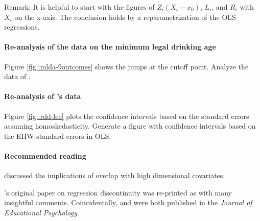 Remark: It is helpful to start with the figures of $Z_i(X_i - x_0)$, $L_i$, and $R_i$ with $X_i$ on the x-axis. The conclusion holds by a reparametrization of the OLS regressions. 



\paragraph{Re-analysis of the data on the minimum legal drinking age}\label{hw::MLDA}


Figure \ref{fig::mlda-9outcomes} shows the jumps at the cutoff point. 
Analyze the data  of \citet{carpenter2009effect}.

\paragraph{Re-analysis of \citet{lee2008randomized}'s data}\label{hw::lee2008-robust}

Figure \ref{fig::rdd-lee} plots the confidence intervals based on the standard errors assuming homoskedasticity. Generate a figure with confidence intervals based on the EHW standard errors in OLS. 




\paragraph{Recommended reading}

\citet{d2017overlap} discussed the implications of overlap with high dimensional covariates. 

\citet{thistlethwaite1960regression}'s original paper on regression discontinuity was re-printed as \citet{thistlewaiteregression2016obs} with many insightful comments.  Coincidentally, \citet{thistlethwaite1960regression} and \citet{Rubin:1974} were both published in the {\it Journal of Educational Psychology}.

